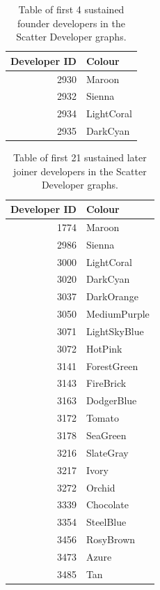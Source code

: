 \begin{table}[H]
\centering
\caption{Table of first 4 sustained founder developers in the Scatter Developer graphs. } 
\label{tab:first_developers_14sustained_founder}
\begin{tabular}{rl}
\toprule
\textbf{Developer ID} & \textbf{Colour} \\ 
\midrule
2930 & \color{Maroon}Maroon \\ 
2932 & \color{Sienna}Sienna \\ 
2934 & \color{LightCoral}LightCoral \\ 
2935 & \color{DarkCyan}DarkCyan \\ 
\bottomrule
\end{tabular}
\end{table}
\newpage 
\begin{table}[H]
\centering
\caption{Table of first 21 sustained later joiner developers in the Scatter Developer graphs. } 
\label{tab:first_developers_14sustained_later_joiner}
\begin{tabular}{rl}
\toprule
\textbf{Developer ID} & \textbf{Colour} \\ 
\midrule
1774 & \color{Maroon}Maroon \\ 
2986 & \color{Sienna}Sienna \\ 
3000 & \color{LightCoral}LightCoral \\ 
3020 & \color{DarkCyan}DarkCyan \\ 
3037 & \color{DarkOrange}DarkOrange \\ 
3050 & \color{MediumPurple}MediumPurple \\ 
3071 & \color{LightSkyBlue}LightSkyBlue \\ 
3072 & \color{HotPink}HotPink \\ 
3141 & \color{ForestGreen}ForestGreen \\ 
3143 & \color{FireBrick}FireBrick \\ 
3163 & \color{DodgerBlue}DodgerBlue \\ 
3172 & \color{Tomato}Tomato \\ 
3178 & \color{SeaGreen}SeaGreen \\ 
3216 & \color{SlateGray}SlateGray \\ 
3217 & \color{Ivory}Ivory \\ 
3272 & \color{Orchid}Orchid \\ 
3339 & \color{Chocolate}Chocolate \\ 
3354 & \color{SteelBlue}SteelBlue \\ 
3456 & \color{RosyBrown}RosyBrown \\ 
3473 & \color{Azure}Azure \\ 
3485 & \color{Tan}Tan \\ 
\bottomrule
\end{tabular}
\end{table}
